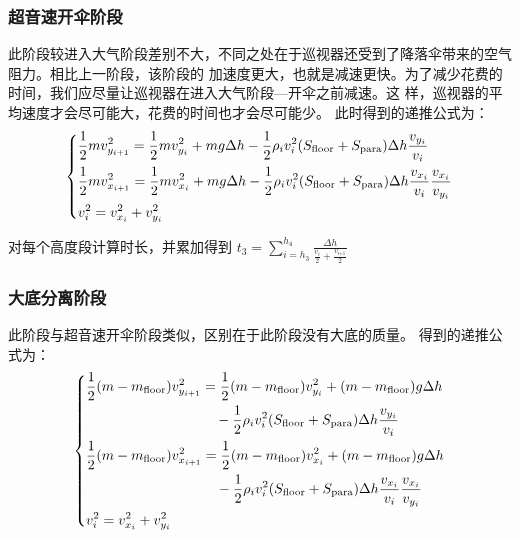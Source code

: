 \documentclass[hyperref,a4paper,UTF8]{ctexart}
\begin{document}
\subsubsection{超音速开伞阶段}
此阶段较进入大气阶段差别不大，不同之处在于巡视器还受到了降落伞带来的空气阻力。相比上一阶段，该阶段的
加速度更大，也就是减速更快。为了减少花费的时间，我们应尽量让巡视器在进入大气阶段---开伞之前减速。这
样，巡视器的平均速度才会尽可能大，花费的时间也才会尽可能少。
此时得到的递推公式为：
\[
    \begin{dcases}
        \frac{1}{2}mv_{y_{i + 1}}^2 = \frac{1}{2}mv_{y_{i}}^2 + mg\Delta h -
        \frac{1}{2}\rho _iv_i^2(S_{\text{floor}}+S_{\text{para}})\Delta h\frac{v_{y_i}}{v_i} \\
        \frac{1}{2}mv_{x_{i + 1}}^2 = \frac{1}{2}mv_{x_{i}}^2 + mg\Delta h -
        \frac{1}{2}\rho _iv_i^2(S_{\text{floor}}+S_{\text{para}})\Delta h\frac{v_{x_i}}{v_i}
        \frac{v_{x_i}}{v_{y_i}}                                                              \\
        v_i^2 = v_{x_i}^2 + v_{y_i}^2
    \end{dcases}
\]

对每个高度段计算时长，并累加得到
$
    \displaystyle t_3=\sum_{i=h_3}^{h_4}{\displaystyle\frac{\Delta h}{\frac{\displaystyle v_i}
        {\displaystyle 2}+\frac{\displaystyle v_{\textrm{i+1}} }{\displaystyle 2}}}
$

\subsubsection{大底分离阶段}
此阶段与超音速开伞阶段类似，区别在于此阶段没有大底的质量。
得到的递推公式为：
\[
    \begin{dcases}
        \begin{split}
            \frac{1}{2}(m-m_{\text{floor}})v_{y_{i + 1}}^2 &=
            \frac{1}{2}(m-m_{\text{floor}})v_{y_{i}}^2 +
            (m-m_{\text{floor}})g\Delta h \\ &\quad - \frac{1}{2}\rho
            _iv_i^2(S_{\text{floor}}+S_{\text{para}})
            \Delta h\frac{v_{y_i}}{v_i}
        \end{split}
        \\
        \begin{split}
            \frac{1}{2}(m-m_{\text{floor}})v_{x_{i + 1}}^2 &=
            \frac{1}{2}(m-m_{\text{floor}})v_{x_{i}}^2 +
            (m-m_{\text{floor}})g\Delta h \\ &\quad -\frac{1}{2}
            \rho _iv_i^2(S_{\text{floor}}+S_{\text{para}})\Delta h
            \frac{v_{x_i}}{v_i}\frac{v_{x_i}}{v_{y_i}}
        \end{split}
        \\
        v_i^2 = v_{x_i}^2 + v_{y_i}^2 \\
    \end{dcases}
\]
\end{document}
